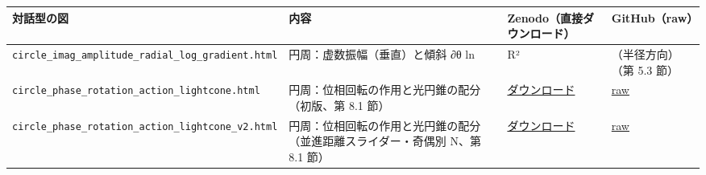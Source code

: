 \documentclass[
  a4paper,
]{ltjsarticle}
\newcounter{none} %
\begin{document}
{\def\LTcaptype{none} %
\begin{longtable}[]{@{}
  >{\raggedright\arraybackslash}p{}
  >{\raggedright\arraybackslash}p{}
  >{\raggedright\arraybackslash}p{}
  >{\raggedright\arraybackslash}p{}@{}}
\toprule\noalign{}
\begin{minipage}[b]{\linewidth}\raggedright
対話型の図
\end{minipage} & \begin{minipage}[b]{\linewidth}\raggedright
内容
\end{minipage} & \begin{minipage}[b]{\linewidth}\raggedright
Zenodo（直接ダウンロード）
\end{minipage} & \begin{minipage}[b]{\linewidth}\raggedright
GitHub（raw）
\end{minipage} \\
\midrule\noalign{}
\endhead
\bottomrule\noalign{}
\endlastfoot
\texttt{circle\_\allowbreak{}imag\_\allowbreak{}amplitude\_\allowbreak{}radial\_\allowbreak{}log\_\allowbreak{}gradient.html} &
円周：虚数振幅（垂直）と傾斜 ∂θ ln & R² & （半径方向）（第 5.3 節） \\
\texttt{circle\_\allowbreak{}phase\_\allowbreak{}rotation\_\allowbreak{}action\_\allowbreak{}lightcone.html} &
円周：位相回転の作用と光円錐の配分（初版、第 8.1 節） &
\href{https://zenodo.org/records/23384929/files/circle_phase_rotation_action_lightcone.html?download=1}{ダウンロード}
&
\href{https://raw.githubusercontent.com/WurabeSeiji/ai-chat-logs-open/main/\%E6\%AC\%A1\%E5\%85\%83\%E3\%81\%AE\%E7\%94\%9F\%E6\%88\%90\%E6\%A7\%8B\%E9\%80\%A0/\%E5\%86\%86\%E5\%91\%A8\%E4\%BD\%8F\%E6\%B0\%91_\%E5\%85\%89\%E5\%86\%86\%E9\%8C\%90\%E8\%AA\%AD\%E5\%87\%BA\%E3\%81\%97_20261014/circle_phase_rotation_action_lightcone.html}{raw} \\
\texttt{circle\_\allowbreak{}phase\_\allowbreak{}rotation\_\allowbreak{}action\_\allowbreak{}lightcone\_\allowbreak{}v2.html} &
円周：位相回転の作用と光円錐の配分（並進距離スライダー・奇偶別 N、第 8.1
節） &
\href{https://zenodo.org/records/23384929/files/circle_phase_rotation_action_lightcone_v2.html?download=1}{ダウンロード}
&
\href{https://raw.githubusercontent.com/WurabeSeiji/ai-chat-logs-open/main/\%E6\%AC\%A1\%E5\%85\%83\%E3\%81\%AE\%E7\%94\%9F\%E6\%88\%90\%E6\%A7\%8B\%E9\%80\%A0/\%E5\%86\%86\%E5\%91\%A8\%E4\%BD\%8F\%E6\%B0\%91_\%E5\%85\%89\%E5\%86\%86\%E9\%8C\%90\%E8\%AA\%AD\%E5\%87\%BA\%E3\%81\%97_20261014/circle_phase_rotation_action_lightcone_v2.html}{raw} \\

\end{longtable}}
\end{document}
